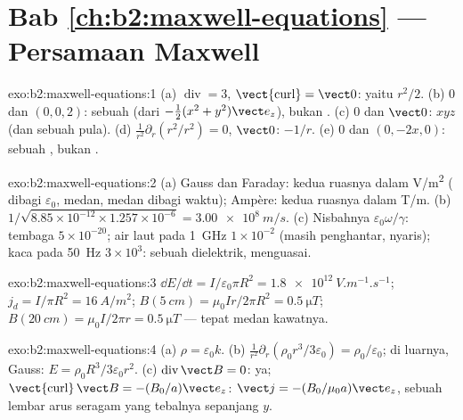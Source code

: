 \section*{Bab \ref{ch:b2:maxwell-equations} --- Persamaan Maxwell}

\begin{solution}{exo:b2:maxwell-equations:1}
(a) $\operatorname{div} = 3$, $\operatorname{\vect{curl}} = \vect 0$: yaitu  $r^2/2$.
(b) $0$ dan $(0, 0, 2)$: sebuah  (dari $-\tfrac12(x^2 + y^2)\vect e_z$), bukan
. (c) $0$ dan $\vect 0$:  $xyz$ (dan sebuah  pula). (d)
$\frac1{r^2}\partial_r(r^2/r^2) = 0$,  $\vect 0$:  $-1/r$. (e)
$0$ dan $(0, -2x, 0)$: sebuah , bukan .
\end{solution}

\begin{solution}{exo:b2:maxwell-equations:2}
(a) Gauss dan Faraday: kedua ruasnya dalam \unit{V/m^2} ( dibagi
$\varepsilon_0$,  medan, medan dibagi waktu); Ampère: kedua ruasnya dalam
\unit{T/m}.
(b) $1/\sqrt{8.85 \times 10^{-12} \times 1.257 \times 10^{-6}} = \qty{3.00e8}{m/s}$. (c) Nisbahnya
$\varepsilon_0\omega/\gamma$: tembaga $5 \times 10^{-20}$; air laut pada \qty{1}{GHz} $1 \times 10^{-2}$
(masih penghantar, nyaris); kaca pada \qty{50}{Hz} $3 \times 10^3$: sebuah dielektrik,
 menguasai.
\end{solution}

\begin{solution}{exo:b2:maxwell-equations:3}
$\dd E/\dd t = I/\varepsilon_0\pi R^2 = \qty{1.8e12}{V.m^{-1}.s^{-1}}$; $j_d = I/\pi R^2 =
\qty{16}{A/m^2}$; $B(\qty{5}{cm}) = \mu_0Ir/2\pi R^2 = \qty{0.5}{\micro T}$; $B(\qty{20}{cm}) =
\mu_0I/2\pi r = \qty{0.5}{\micro T}$ --- tepat medan kawatnya.
\end{solution}

\begin{solution}{exo:b2:maxwell-equations:4}
(a) $\rho = \varepsilon_0k$. (b) $\frac1{r^2}\partial_r(\rho_0r^3/3\varepsilon_0) = \rho_0/\varepsilon_0$;
di luarnya, Gauss: $E = \rho_0R^3/3\varepsilon_0r^2$. (c) $\operatorname{div}\vect B = 0$: ya;
$\operatorname{\vect{curl}}\vect B = -(B_0/a)\vect e_z$: $\vect j = -(B_0/\mu_0a)\vect e_z$, sebuah
lembar arus seragam yang tebalnya sepanjang $y$.
\end{solution}

